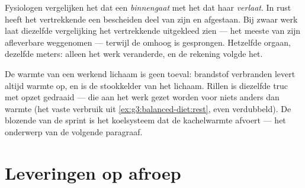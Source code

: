 \begin{example}\label{ex:g7:organs-at-work:measure}
Fysiologen vergelijken het  dat een  \emph{binnengaat} met het
 dat haar \emph{verlaat}. In rust heeft het vertrekkende  een
bescheiden deel van zijn  en  afgestaan. Bij zwaar werk
laat diezelfde vergelijking het vertrekkende  uitgekleed zien --- het
meeste van zijn afleverbare  weggenomen --- terwijl de
 omhoog is gesprongen. Hetzelfde orgaan, dezelfde meters:
alleen het werk veranderde, en de rekening volgde het.
\end{example}

\begin{remark}\label{rem:g7:organs-at-work:warmth}
De warmte van een werkend lichaam is geen toeval: brandstof verbranden
levert altijd warmte op, en  is de stookkelder van het lichaam.
Rillen is diezelfde truc met opzet gedraaid ---  die aan het werk
gezet worden voor niets anders dan warmte (het vaste verbruik uit
\cref{ex:g3:balanced-diet:rest}, even verdubbeld). De blozende  van
de sprint is het koelsysteem dat de kachelwarmte afvoert --- het onderwerp
van de volgende paragraaf.
\end{remark}

\section{Leveringen op afroep}

